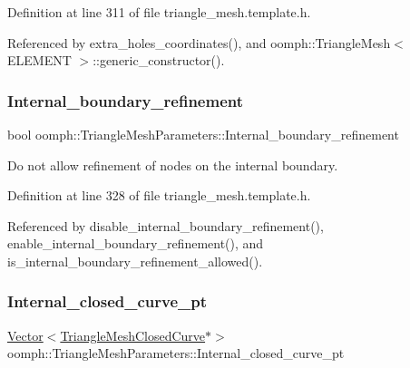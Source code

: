 Definition at line 311 of file triangle\+\_\+mesh.\+template.\+h.



Referenced by extra\+\_\+holes\+\_\+coordinates(), and oomph\+::\+Triangle\+Mesh$<$ E\+L\+E\+M\+E\+N\+T $>$\+::generic\+\_\+constructor().

\mbox{\label{classoomph_1_1TriangleMeshParameters_a5d4823276b94bc4b3d4dbbd8d351596c}} 
\subsubsection{\texorpdfstring{Internal\+\_\+boundary\+\_\+refinement}{Internal\_boundary\_refinement}}
{\footnotesize\ttfamily bool oomph\+::\+Triangle\+Mesh\+Parameters\+::\+Internal\+\_\+boundary\+\_\+refinement\hspace{0.3cm}{\ttfamily [protected]}}



Do not allow refinement of nodes on the internal boundary. 



Definition at line 328 of file triangle\+\_\+mesh.\+template.\+h.



Referenced by disable\+\_\+internal\+\_\+boundary\+\_\+refinement(), enable\+\_\+internal\+\_\+boundary\+\_\+refinement(), and is\+\_\+internal\+\_\+boundary\+\_\+refinement\+\_\+allowed().

\mbox{\label{classoomph_1_1TriangleMeshParameters_a99475f8749f590b46554e6e6d9e8af78}} 
\subsubsection{\texorpdfstring{Internal\+\_\+closed\+\_\+curve\+\_\+pt}{Internal\_closed\_curve\_pt}}
{\footnotesize\ttfamily \hyperlink{classoomph_1_1Vector}{Vector}$<$\hyperlink{classoomph_1_1TriangleMeshClosedCurve}{Triangle\+Mesh\+Closed\+Curve}$\ast$$>$ oomph\+::\+Triangle\+Mesh\+Parameters\+::\+Internal\+\_\+closed\+\_\+curve\+\_\+pt\hspace{0.3cm}{\ttfamily [protected]}}



